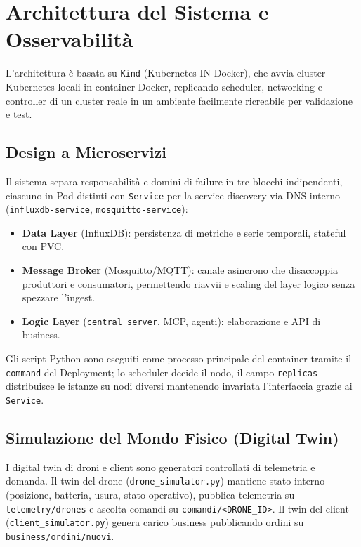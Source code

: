
\chapter{Architettura del Sistema e Osservabilità}
\label{cap:architettura_osservabilita}

L'architettura è basata su \texttt{Kind} (Kubernetes IN Docker), che avvia cluster Kubernetes locali in container Docker, replicando scheduler, networking e controller di un cluster reale in un ambiente facilmente ricreabile per validazione e test.

\section{Design a Microservizi}
\label{sec:design_microservizi}

Il sistema separa responsabilità e domini di failure in tre blocchi indipendenti, ciascuno in Pod distinti con \texttt{Service} per la service discovery via DNS interno (\texttt{influxdb-service}, \texttt{mosquitto-service}):
\begin{itemize}
    \item \textbf{Data Layer} (InfluxDB): persistenza di metriche e serie temporali, stateful con PVC.
    \item \textbf{Message Broker} (Mosquitto/MQTT): canale asincrono che disaccoppia produttori e consumatori, permettendo riavvii e scaling del layer logico senza spezzare l'ingest.
    \item \textbf{Logic Layer} (\texttt{central\_server}, MCP, agenti): elaborazione e API di business.
\end{itemize}
Gli script Python sono eseguiti come processo principale del container tramite il \texttt{command} del Deployment; lo scheduler decide il nodo, il campo \texttt{replicas} distribuisce le istanze su nodi diversi mantenendo invariata l'interfaccia grazie ai \texttt{Service}.

\section{Simulazione del Mondo Fisico (Digital Twin)}
\label{sec:digital_twin}

I digital twin di droni e client sono generatori controllati di telemetria e domanda. Il twin del drone (\texttt{drone\_simulator.py}) mantiene stato interno (posizione, batteria, usura, stato operativo), pubblica telemetria su \texttt{telemetry/drones} e ascolta comandi su \texttt{comandi/<DRONE\_ID>}. Il twin del client (\texttt{client\_simulator.py}) genera carico business pubblicando ordini su \texttt{business/ordini/nuovi}.


